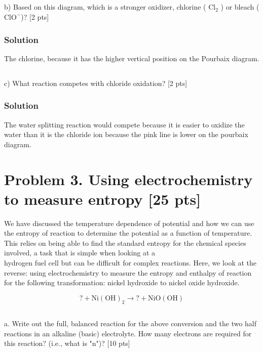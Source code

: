 \documentclass[12pt]{article}
\begin{document}
\subsection{}
b) Based on this diagram, which is a stronger oxidizer, chlorine ( $\mathrm{Cl}_{2}$ ) or bleach ( $\mathrm{ClO}^{-}$)? [2 pts]\\[0pt]
\subsubsection{Solution}
The chlorine, because it has the higher vertical position on the Pourbaix diagram.
\subsection{}
c) What reaction competes with chloride oxidation? [2 pts]
\subsubsection{Solution}
The water splitting reaction would compete because it is easier to oxidize the water than it is the chloride ion because the pink line is lower on the pourbaix diagram.

\section{Problem 3. Using electrochemistry to measure entropy [25 pts]}
We have discussed the temperature dependence of potential and how we can use the entropy of reaction to determine the potential as a function of temperature. This relies on being able to find the standard entropy for the chemical species involved, a task that is simple when looking at a\\
hydrogen fuel cell but can be difficult for complex reactions. Here, we look at the reverse: using electrochemistry to measure the entropy and enthalpy of reaction for the following transformation: nickel hydroxide to nickel oxide hydroxide.

$$
?+\mathrm{Ni}(\mathrm{OH})_{2} \rightarrow ?+\mathrm{NiO}(\mathrm{OH})
$$
\subsection{}
a. Write out the full, balanced reaction for the above conversion and the two half reactions in an alkaline (basic) electrolyte. How many electrons are required for this reaction? (i.e., what is "n")? [10 pts]\\
\end{document}
